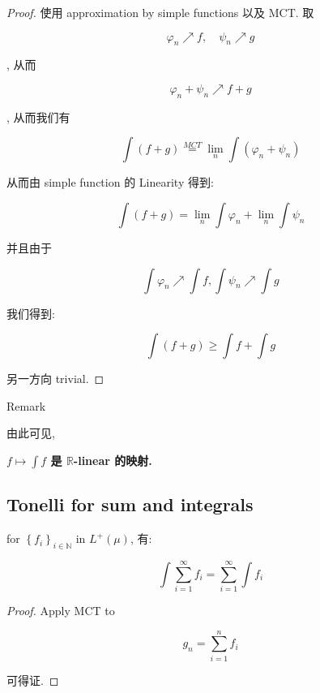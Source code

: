 \begin{proof}

使用 approximation by simple functions 以及 MCT. 取

\[\varphi_{n}\operatorname{\nearrow }f,\quad\psi_{n}\operatorname{\nearrow }g\]

, 从而

\[\varphi_{n} + \psi_{n}\operatorname{\nearrow }f + g\]

, 从而我们有

\[\int(f + g)\overset{MCT}{=}\lim\limits_{n}\int(\varphi_{n} + \psi_{n})\]

从而由 simple function 的 Linearity 得到:

\[\int(f + g) = \lim\limits_{n}\int\varphi_{n} + \lim\limits_{n}\int\psi_{n}\]

并且由于

\[\int\varphi_{n}\operatorname{\nearrow }\int f,\int\psi_{n}\operatorname{\nearrow }\int g\]

我们得到:

\[\int(f + g) \geq \int f + \int g\]

另一方向 trivial.

\end{proof}

\begin{qlremark}{Remark}

由此可见,

\textbf{\(f\mapsto\int f\) 是 \(\mathbb{R}\)-linear 的映射.}

\end{qlremark}

\subsection{Tonelli for sum and integrals}\label{tonelli-for-sum-and-integrals}

\begin{corollary}{}

for \(\left\{ f_{i} \right\}_{i \in \mathbb{N}}\) in \(L^{+}(\mu)\), 有:

\[\int\sum\limits_{i = 1}^{\infty}f_{i} = \sum\limits_{i = 1}^{\infty}\int f_{i}\]

\end{corollary}

\begin{proof}

Apply MCT to

\[g_{n} = \sum\limits_{i = 1}^{n}f_{i}\]

可得证.

\end{proof}

